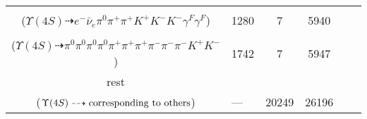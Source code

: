 \documentclass[landscape]{article}
\newcounter{rownumbers}
\newcommand\rn{\stepcounter{rownumbers}\arabic{rownumbers}}
\newcommand{\EOL}{\\} %
\newcommand{\topoTags}[1]{#1} %
\begin{document}
\begin{longtable}{clcccc}
\rn & \makecell[l]{ $ 
\Upsilon(4S) \rightarrow B^{0} \bar{B}^{0} ,
B^{0} \rightarrow \pi^{0} K^{+} K^{-} ,
\bar{B}^{0} \rightarrow e^{-} \bar{\nu}_{e} D^{*+} \gamma^{F} \gamma^{F} ,
D^{*+} \rightarrow \pi^{+} D^{0} ,
D^{0} \rightarrow \pi^{+} K^{-} 
$ \\ ($
\Upsilon(4S) \dashrightarrow e^{-} \bar{\nu}_{e} \pi^{0} \pi^{+} \pi^{+} K^{+} K^{-} K^{-} \gamma^{F} \gamma^{F} 
$) } & \topoTags{1280 & }7 & 5940 \EOL

\rn & \makecell[l]{ $ 
\Upsilon(4S) \rightarrow B^{0} \bar{B}^{0} ,
B^{0} \rightarrow \pi^{0} K^{+} K^{-} ,
\bar{B}^{0} \rightarrow \pi^{0} \pi^{+} \pi^{-} \pi^{-} D^{*+} ,
D^{*+} \rightarrow \pi^{0} D^{+} ,
D^{+} \rightarrow \pi^{0} \pi^{+} K_{S}^{0} ,
K_{S}^{0} \rightarrow \pi^{+} \pi^{-} 
$ \\ ($
\Upsilon(4S) \dashrightarrow \pi^{0} \pi^{0} \pi^{0} \pi^{0} \pi^{+} \pi^{+} \pi^{+} \pi^{-} \pi^{-} \pi^{-} K^{+} K^{-} 
$) } & \topoTags{1742 & }7 & 5947 \EOL

rest & \makecell[l]{ $ 
\Upsilon(4S) \rightarrow \rm{others \  (16540 \  in \  total)}
$ \\ ($
\Upsilon(4S) \dashrightarrow \rm{corresponding\ to\ others}
$) } & \topoTags{--- & }20249 & 26196 \\ \hline

\end{longtable}
\end{document}
